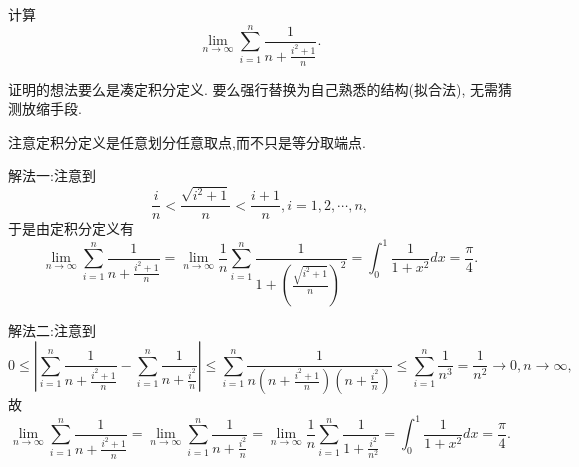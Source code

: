 \documentclass[../../main.tex]{subfiles}
\begin{document}
\begin{example}
计算
\[
\lim_{n\rightarrow\infty}\sum_{i = 1}^{n}\frac{1}{n+\frac{i^{2}+1}{n}}.
\]
\end{example}
\begin{note}
证明的想法要么是凑定积分定义. 要么强行替换为自己熟悉的结构(拟合法), 无需猜测放缩手段.
\end{note}
\begin{remark}
注意定积分定义是任意划分任意取点,而不只是等分取端点.
\end{remark}
\begin{solution}
{\color{blue}解法一:}注意到
\[
\frac{i}{n}<\frac{\sqrt{i^{2}+1}}{n}<\frac{i + 1}{n},i = 1,2,\cdots,n,
\]
于是由定积分定义有
\[
\lim_{n\rightarrow\infty}\sum_{i = 1}^{n}\frac{1}{n+\frac{i^{2}+1}{n}}=\lim_{n\rightarrow\infty}\frac{1}{n}\sum_{i = 1}^{n}\frac{1}{1+\left(\frac{\sqrt{i^{2}+1}}{n}\right)^{2}}=\int_{0}^{1}\frac{1}{1 + x^{2}}dx=\frac{\pi}{4}.
\]

{\color{blue}解法二:}注意到
\[
0\leq\left|\sum_{i = 1}^{n}\frac{1}{n+\frac{i^{2}+1}{n}}-\sum_{i = 1}^{n}\frac{1}{n+\frac{i^{2}}{n}}\right|\leqslant\sum_{i = 1}^{n}\frac{1}{n\left(n+\frac{i^{2}+1}{n}\right)\left(n+\frac{i^{2}}{n}\right)}\leqslant\sum_{i = 1}^{n}\frac{1}{n^{3}}=\frac{1}{n^{2}}\rightarrow0,n\rightarrow\infty,
\]
故
\[
\lim_{n\rightarrow\infty}\sum_{i = 1}^{n}\frac{1}{n+\frac{i^{2}+1}{n}}=\lim_{n\rightarrow\infty}\sum_{i = 1}^{n}\frac{1}{n+\frac{i^{2}}{n}}=\lim_{n\rightarrow\infty}\frac{1}{n}\sum_{i = 1}^{n}\frac{1}{1+\frac{i^{2}}{n^{2}}}=\int_{0}^{1}\frac{1}{1 + x^{2}}dx=\frac{\pi}{4}.
\]
\end{solution}
\end{document}
